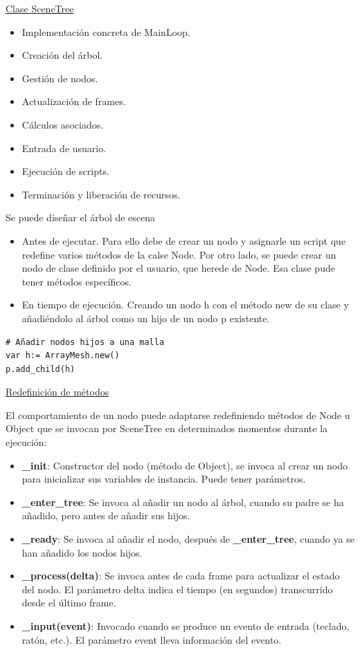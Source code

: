 \documentclass[12pt]{book} %
\providecommand{\tightlist}{%
  \setlength{\itemsep}{0pt}\setlength{\parskip}{0pt}}
\begin{document}
\underline{Clase SceneTree}

\begin{itemize}
\tightlist
\item
  Implementación concreta de MainLoop.
\item
  Creación del árbol.
\item
  Gestión de nodos.
\item
  Actualización de frames.
\item
  Cálculos asociados.
\item
  Entrada de usuario.
\item
  Ejecución de scripts.
\item
  Terminación y liberación de recursos.
\end{itemize}

Se puede diseñar el árbol de escena

\begin{itemize}
\tightlist
\item
  Antes de ejecutar. Para ello debe de crear un nodo y asignarle un
  script que redefine varios métodos de la calse Node. Por otro lado, se
  puede crear un nodo de clase definido por el usuario, que herede de
  Node. Esa clase pude tener métodos específicos.
\item
  En tiempo de ejecución. Creando un nodo h con el método new de su
  clase y añadiéndolo al árbol como un hijo de un nodo p existente.
\end{itemize}

\begin{lstlisting}
# Añadir nodos hijos a una malla
var h:= ArrayMesh.new()
p.add_child(h)
\end{lstlisting}

\underline{Redefinición de métodos}

El comportamiento de un nodo puede adaptarse redefiniendo métodos de
Node u Object que se invocan por SceneTree en determinados momentos
durante la ejecución:

\begin{itemize}
\tightlist
\item
  \textbf{\_init}: Constructor del nodo (método de Object), se invoca al
  crear un nodo para inicializar sus variables de instancia. Puede tener
  parámetros.
\item
  \textbf{\_enter\_tree}: Se invoca al añadir un nodo al árbol, cuando
  su padre se ha añadido, pero antes de añadir sus hijos.
\item
  \textbf{\_ready}: Se invoca al añadir el nodo, después de
  \textbf{\_enter\_tree}, cuando ya se han añadido los nodos hijos.
\item
  \textbf{\_process(delta)}: Se invoca antes de cada frame para
  actualizar el estado del nodo. El parámetro delta indica el tiempo (en
  segundos) transcurrido desde el último frame.
\item
  \textbf{\_input(event)}: Invocado cuando se produce un evento de
  entrada (teclado, ratón, etc.). El parámetro event lleva información
  del evento.
\end{itemize}
\end{document}
